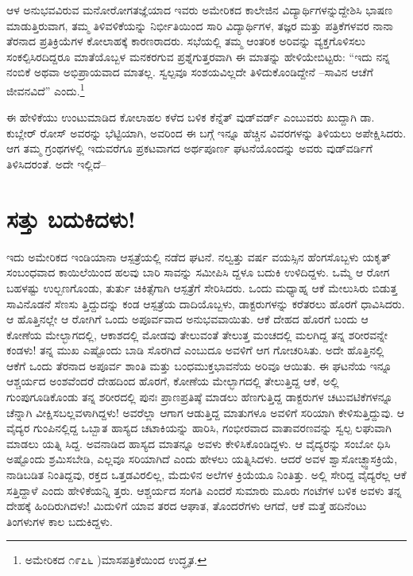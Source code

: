 ಆಳ ಅನುಭವವಿರುವ ಮನೋರೋಗತಜ್ಞೆಯಾದ ಇವರು ಅಮೇರಿಕದ ಕಾಲೇಜಿನ ವಿದ್ಯಾರ್ಥಿಗಳನ್ನುದ್ದೇಶಿಸಿ ಭಾಷಣ ಮಾಡುತ್ತಿರುವಾಗ, ತಮ್ಮ ತಿಳಿವಳಿಕೆಯನ್ನು ನಿರ್ಭೀತಿಯಿಂದ ಸಾರಿ ವಿದ್ಯಾರ್ಥಿಗಳ, ತಜ್ಞರ ಮತ್ತು ಪತ್ರಿಕೆಗಳವರ ನಾನಾ ತೆರನಾದ ಪ್ರತಿಕ್ರಿಯೆಗಳ ಕೋಲಾಹಕ್ಕೆ ಕಾರಣರಾದರು. ಸಭೆಯಲ್ಲಿ ತಮ್ಮ ಆಂತರಿಕ ಅರಿವನ್ನು ವ್ಯಕ್ತಗೊಳಿಸಲು ಸಂಕಲ್ಪಿಸಿರದಿದ್ದರೂ ಮಾತೆಯೊಬ್ಬಳ ಮನಕರಗುವ ಪ್ರಶ್ನೆಗುತ್ತರವಾಗಿ ಈ ಮಾತನ್ನು ಹೇಳಿಯೇಬಿಟ್ಟರು: “ಇದು ನನ್ನ ನಂಬಿಕೆ ಅಥವಾ ಅಭಿಪ್ರಾಯವಾದ ಮಾತಲ್ಲ. ಸ್ವಲ್ಪವೂ ಸಂಶಯವಿಲ್ಲದೇ ತಿಳಿದುಕೊಂಡಿದ್ದೇನೆ –ಸಾವಿನ ಆಚೆಗೆ ಜೀವನವಿದೆ” ಎಂದು.\footnote{ಅಮೇರಿಕದ ೧೯೭೬ )ಮಾಸಪತ್ರಿಕೆಯಿಂದ ಉದ್ಧೃತ.}

ಈ ಹೇಳಿಕೆಯು ಉಂಟುಮಾಡಿದ ಕೋಲಾಹಲ ಕಳೆದ ಬಳಿಕ ಕೆನ್ನೆತ್ ವುಡ್​ವರ್ಡ್ ಎಂಬುವರು ಖುದ್ದಾಗಿ ಡಾ. ಕುಬ್ಲೇರ್ ರೋಸ್ ಅವರನ್ನು ಭೆಟ್ಟಿಯಾಗಿ, ಅವರಿಂದ ಈ ಬಗ್ಗೆ ಇನ್ನೂ ಹೆಚ್ಚಿನ ವಿವರಗಳನ್ನು ತಿಳಿಯಲು ಅಪೇಕ್ಷಿಸಿದರು. ಆಗ ತಮ್ಮ ಗ್ರಂಥಗಳಲ್ಲಿ ಇದುವರೆಗೂ ಪ್ರಕಟವಾಗದ ಅರ್ಥಪೂರ್ಣ ಘಟನೆಯೊಂದನ್ನು ಅವರು ವುಡ್​ವರ್ಡಿಗೆ ತಿಳಿಸಿದರಂತೆ. ಅದೇ ಇಲ್ಲಿದೆ–


\section{ಸತ್ತು ಬದುಕಿದಳು!}

ಇದು ಅಮೇರಿಕದ ಇಂಡಿಯಾನಾ ಆಸ್ಪತ್ರೆಯಲ್ಲಿ ನಡೆದ ಘಟನೆ. ನಲ್ವತ್ತು ವರ್ಷ ವಯಸ್ಸಿನ ಹೆಂಗಸೊಬ್ಬಳು ಯಕೃತ್ ಸಂಬಂಧವಾದ ಕಾಯಿಲೆಯಿಂದ ಹಲವು ಬಾರಿ ಸಾವನ್ನು ಸಮೀಪಿಸಿ ದ್ದಳೂ ಬದುಕಿ ಉಳಿದಿದ್ದಳು. ಒಮ್ಮೆ ಆ ರೋಗ ಬಹಳಷ್ಟು ಉಲ್ಬಣಗೊಂಡು, ತುರ್ತು ಚಿಕಿತ್ಸೆಗಾಗಿ ಆಸ್ಪತ್ರೆಗೆ ಸೇರಿಸಿದರು. ಒಂದು ಮಧ್ಯಾಹ್ನ ಆಕೆ ಮೇಲುಸಿರು ಬಿಡುತ್ತ ಸಾವಿನೊಡನೆ ಸೆಣಸು ತ್ತಿದ್ದುದನ್ನು ಕಂಡ ಆಸ್ಪತ್ರೆಯ ದಾದಿಯೊಬ್ಬಳು, ಡಾಕ್ಟರುಗಳನ್ನು ಕರೆತರಲು ಹೊರಗೆ ಧಾವಿಸಿದರು. ಆ ಹೊತ್ತಿನಲ್ಲೇ ಆ ರೋಗಿಗೆ ಒಂದು ಅಪೂರ್ವವಾದ ಅನುಭವವಾಯಿತು. ಆಕೆ ದೇಹದ ಹೊರಗೆ ಬಂದು ಆ ಕೋಣೆಯ ಮೇಲ್ಭಾಗದಲ್ಲಿ, ಆಕಾಶದಲ್ಲಿ ಮೋಡವು ತೇಲುವಂತೆ ತೇಲುತ್ತ ಮಂಚದಲ್ಲಿ ಮಲಗಿದ್ದ ತನ್ನ ಶರೀರವನ್ನೇ ಕಂಡಳು! ತನ್ನ ಮುಖ ಎಷ್ಟೊಂದು ಬಾಡಿ ಸೊರಗಿದೆ ಎಂಬುದೂ ಅವಳಿಗೆ ಆಗ ಗೋಚರಿಸಿತು. ಅದೇ ಹೊತ್ತಿನಲ್ಲಿ ಆಕೆಗೆ ಒಂದು ತೆರನಾದ ಅಪೂರ್ವ ಶಾಂತಿ ಮತ್ತು ಬಂಧಮುಕ್ತಭಾವನೆಯ ಅರಿವೂ ಆಯಿತು. ಈ ಘಟನೆಯ ಇನ್ನೂ ಆಶ್ಚರ್ಯದ ಅಂಶವೆಂದರೆ ದೇಹದಿಂದ ಹೊರಗೆ, ಕೋಣೆಯ ಮೇಲ್ಭಾಗದಲ್ಲಿ ತೇಲುತ್ತಿದ್ದ ಆಕೆ, ಅಲ್ಲಿ ಗುಂಪುಗೂಡಿಕೊಂಡು ತನ್ನ ಶರೀರದಲ್ಲಿ ಪುನಃ ಪ್ರಾಣಪ್ರತಿಷ್ಠೆ ಮಾಡಲು ಹೆಣಗುತ್ತಿದ್ದ ಡಾಕ್ಟರುಗಳ ಚಟುವಟಿಕೆಗಳನ್ನೂ ಚೆನ್ನಾಗಿ ವೀಕ್ಷಿಸಬಲ್ಲವಳಾಗಿದ್ದಳು! ಅವರೆಲ್ಲಾ ಆಗಾಗ ಆಡುತ್ತಿದ್ದ ಮಾತುಗಳೂ ಅವಳಿಗೆ ಸರಿಯಾಗಿ ಕೇಳಿಸುತ್ತಿದ್ದುವು. ಆ ವೈದ್ಯರ ಗುಂಪಿನಲ್ಲಿದ್ದ ಒಬ್ಬಾತ ಹಾಸ್ಯದ ಚಟಾಕಿಯನ್ನು ಹಾರಿಸಿ, ಗಂಭೀರವಾದ ವಾತಾವರಣವನ್ನು ಸ್ವಲ್ಪ ಲಘುವಾಗಿ ಮಾಡಲು ಯತ್ನಿ ಸಿದ್ದ. ಅವನಾಡಿದ ಹಾಸ್ಯದ ಮಾತನ್ನೂ ಅವಳು ಕೇಳಿಸಿಕೊಂಡಿದ್ದಳು. ಆ ವೈದ್ಯರನ್ನು ಸಂಬೋ ಧಿಸಿ ಅಷ್ಟೊಂದು ಶ್ರಮಿಸಬೇಡಿ, ಎಲ್ಲವೂ ಸರಿಯಾಗಿದೆ ಎಂದು ಹೇಳಲು ಯತ್ನಿಸಿದಳು. ಆದರೆ ಅವಳ ಶ್ವಾಸೋಚ್ಛ್ವಾಸಕ್ರಿಯೆ, ನಾಡಿಬಡಿತ ನಿಂತಿದ್ದವು, ರಕ್ತದ ಒತ್ತಡವಿರಲಿಲ್ಲ, ಮೆದುಳಿನ ಅಲೆಗಳ ಕ್ರಿಯೆಯೂ ನಿಂತಿತ್ತು. ಅಲ್ಲಿ ಸೇರಿದ್ದ ವೈದ್ಯರೆಲ್ಲ ಆಕೆ ಸತ್ತಿದ್ದಾಳೆ ಎಂದು ಹೇಳಿಕೆಯನ್ನಿ ತ್ತರು. ಆಶ್ಚರ್ಯದ ಸಂಗತಿ ಎಂದರೆ ಸುಮಾರು ಮೂರು ಗಂಟೆಗಳ ಬಳಿಕ ಅವಳು ತನ್ನ ದೇಹಕ್ಕೆ ಹಿಂದಿರುಗಿದಳು! ಮಿದುಳಿಗೆ ಯಾವ ತರದ ಆಘಾತ, ತೊಂದರೆಗಳು ಆಗದೆ, ಆಕೆ ಮತ್ತೆ ಹದಿನೆಂಟು ತಿಂಗಳುಗಳ ಕಾಲ ಬದುಕಿದ್ದಳು.


